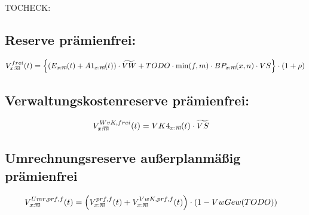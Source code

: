 \documentclass[a4paper,10pt]{article}
\makeatletter
\newcommand{\xn}{{\act[x]{n}}}
\DeclareRobustCommand{\act}[2][]{%
\def\arraystretch{0}%
\setlength\arraycolsep{0.5pt}%
\setlength\arrayrulewidth{0.5pt}%
\setbox0=\hbox{$\scriptstyle#1\ifx#1\empty{asdf}\else:\fi#2$}%
\begin{array}[b]{*2{@{}>{\scriptstyle}c}|}
\cline{2-2}%
\rule[1.25pt]{0pt}{\ht0}%
#1\ifx#1\empty\else:\fi & #2%
\end{array}%
}
\makeatother
\begin{document}
TOCHECK:
\subsection{Reserve prämienfrei:}
\begin{align*}
V^{frei}_\xn(t) &= \left\{(E_\xn(t) + A1_\xn(t))\cdot\widetilde{VW} + TODO \cdot \min(f,m) \cdot BP_\xn(x,n)\cdot VS\right\} \cdot (1+\rho) \\
\end{align*}

\subsection{Verwaltungskostenreserve prämienfrei:}
\begin{align*}
V^{WvK,frei}_\xn(t) &= VK4_\xn(t) \cdot \widetilde{VS}
\end{align*}

\subsection{Umrechnungsreserve außerplanmäßig prämienfrei}
\begin{align*}
 V_\xn^{Umr, prf, f}(t) &= \left(V^{prf,f}_\xn(t) + V^{VwK,prf,f}_\xn(t)\right)\cdot (1-VwGew(TODO))
\end{align*}
\end{document}
